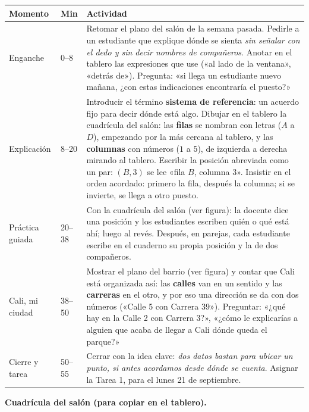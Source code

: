 \documentclass[11pt]{article}
\begin{document}
\begin{center}
{\renewcommand{\arraystretch}{1.3}
\begin{tabularx}{\linewidth}{@{}l l X@{}}
  \toprule
  \textbf{Momento} & \textbf{Min} & \textbf{Actividad}\\
  \midrule
  Enganche & 0--8 & Retomar el plano del salón de la semana pasada. Pedirle a un estudiante
    que explique dónde se sienta \emph{sin señalar con el dedo y sin decir nombres de
    compañeros}. Anotar en el tablero las expresiones que use («al lado de la ventana»,
    «detrás de»). Pregunta: «si llega un estudiante nuevo mañana, ¿con estas indicaciones
    encontraría el puesto?»\\
  Explicación & 8--20 & Introducir el término \textbf{sistema de referencia}: un acuerdo
    fijo para decir dónde está algo. Dibujar en el tablero la cuadrícula del salón: las
    \textbf{filas} se nombran con letras ($A$ a $D$), empezando por la más cercana al
    tablero, y las \textbf{columnas} con números ($1$ a $5$), de izquierda a derecha mirando
    al tablero. Escribir la posición abreviada como un par:
    $(B,3)$ se lee «fila $B$, columna $3$». Insistir en el orden acordado: primero la fila,
    después la columna; si se invierte, se llega a otro puesto.\\
  Práctica guiada & 20--38 & Con la cuadrícula del salón (ver figura): la docente dice una
    posición y los estudiantes escriben quién o qué está ahí; luego al revés. Después, en
    parejas, cada estudiante escribe en el cuaderno su propia posición y la de dos
    compañeros.\\
  Cali, mi ciudad & 38--50 & Mostrar el plano del barrio (ver figura) y contar que Cali está
    organizada así: las \textbf{calles} van en un sentido y las \textbf{carreras} en el otro,
    y por eso una dirección se da con dos números («Calle 5 con Carrera 39»). Preguntar:
    «¿qué hay en la Calle 2 con Carrera 3?», «¿cómo le explicarías a alguien que acaba de
    llegar a Cali dónde queda el parque?»\\
  Cierre y tarea & 50--55 & Cerrar con la idea clave: \emph{dos datos bastan para ubicar un
    punto, si antes acordamos desde dónde se cuenta}. Asignar la Tarea 1, para el lunes 21 de
    septiembre.\\
  \bottomrule
\end{tabularx}}
\end{center}

\textbf{Cuadrícula del salón (para copiar en el tablero).}
\end{document}
